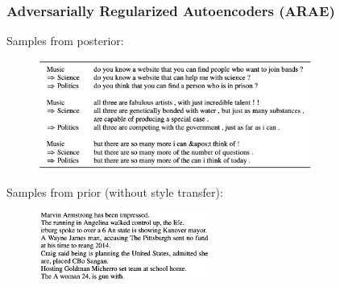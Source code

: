 \documentclass[10pt]{beamer}
\begin{document}
\begin{frame}
\frametitle{Adversarially Regularized Autoencoders (ARAE)}
Samples from posterior:
\begin{figure}
\centering
\includegraphics[width=0.8\textwidth]{images/arae-yahoo-samples}
\end{figure}

Samples from prior (without style transfer):
\begin{figure}
\centering
\includegraphics[width=0.5\textwidth]{images/arae-samples-from-prior}
\end{figure}
\end{frame}


\end{document}
